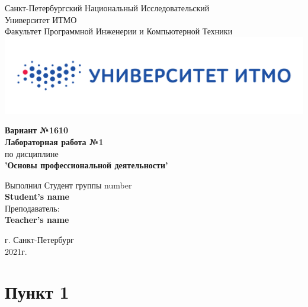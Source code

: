 \documentclass[12pt,onecolumn]{article}
\begin{document}
\setcounter{tocdepth}{4}
\begin{center}
    Санкт-Петербургский Национальный Исследовательский\\ 
    Университет ИТМО\\
    Факультет Программной Инженерии и Компьютерной Техники\\
    \includegraphics[scale=0.3]{itm.jpg} %
\end{center}
\vspace{1cm}


\begin{center}
    \large \textbf{Вариант №1610}\\
    \textbf{Лабораторная работа №1}\\
    по дисциплине\\
    \textbf{'Основы профессиональной деятельности'}
\end{center}

\vspace{2cm}

\begin{flushright}
  Выполнил Студент  группы number\\
  \textbf{Student's name}\\
  Преподаватель: \\
  \textbf{Teacher's name}\\
\end{flushright}

\vspace{6cm}
\begin{center}
    г. Санкт-Петербург\\
    2021г.
\end{center}

\newpage
\tableofcontents
\newpage

\section{Пункт 1}
\end{document}
